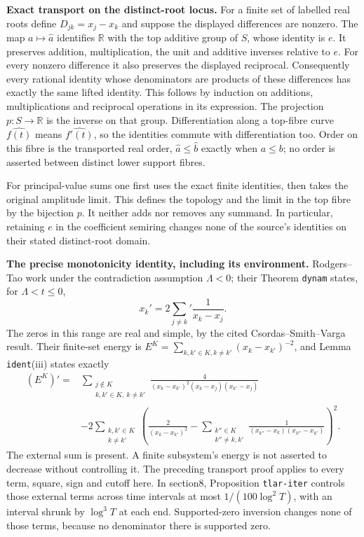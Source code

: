 \documentclass[11pt,a4paper]{article}
\theoremstyle{definition}\newtheorem{definition}[theorem]{Definition}
\begin{document}
\RD\textbf{Exact transport on the distinct-root locus.}
For a finite set of labelled real roots define
$D_{jk}=x_j-x_k$ and suppose the displayed differences are nonzero.
The map $a\mapsto\widehat a$ identifies $\mathbb R$ with the top
additive group of $S$, whose identity is $e$. It preserves addition,
multiplication, the unit and additive inverses relative to $e$.
For every nonzero difference it also preserves the displayed
reciprocal. Consequently every rational identity whose denominators
are products of these differences has exactly the same lifted identity.
This follows by induction on additions, multiplications and reciprocal
operations in its expression. The projection $p:S\to\mathbb R$
is the inverse on that group. Differentiation along a top-fibre curve
$\widehat{f(t)}$ means $\widehat{f'(t)}$, so the identities commute
with differentiation too. Order on this fibre is the transported real
order, $\widehat a\le\widehat b$ exactly when $a\le b$; no order is
asserted between distinct lower support fibres.

For principal-value sums one first uses the exact finite identities,
then takes the original amplitude limit. This defines the topology and
the limit in the top fibre by the bijection $p$. It neither adds nor
removes any summand. In particular, retaining $e$ in the coefficient
semiring changes none of the source's identities on their stated
distinct-root domain.

\RD\textbf{The precise monotonicity identity, including its environment.}
Rodgers--Tao work under the contradiction assumption $\Lambda<0$;
their Theorem \texttt{dynam} states, for $\Lambda<t\le0$,
\[
 x_k'=2\sum_{j\ne k}'\frac1{x_k-x_j}.
\]
The zeros in this range are real and simple, by the cited
Csordas--Smith--Varga result. Their finite-set energy is
$E^K=\sum_{k,k'\in K,k\ne k'}(x_k-x_{k'})^{-2}$, and Lemma
\texttt{ident}(iii) states exactly
\begin{align*}
 (E^K)'={}&
 \sum_{\substack{j\notin K\\ k,k'\in K,\ k\ne k'}}
 \frac4{(x_k-x_{k'})^2(x_k-x_j)(x_{k'}-x_j)}\\
 &-2\sum_{\substack{k,k'\in K\\k\ne k'}}
 \left(\frac2{(x_k-x_{k'})^2}
 -\sum_{\substack{k''\in K\\k''\ne k,k'}}
 \frac1{(x_{k''}-x_k)(x_{k''}-x_{k'})}\right)^2.
\end{align*}
The external sum is present. A finite subsystem's energy is not
asserted to decrease without controlling it. The preceding transport
proof applies to every term, square, sign and cutoff here. In section8,
Proposition \texttt{tlar-iter} controls those external terms across
time intervals at most $1/(100\log^2T)$, with an interval shrunk by
$\log^3T$ at each end. Supported-zero inversion changes none of those
terms, because no denominator there is supported zero.
\end{document}
